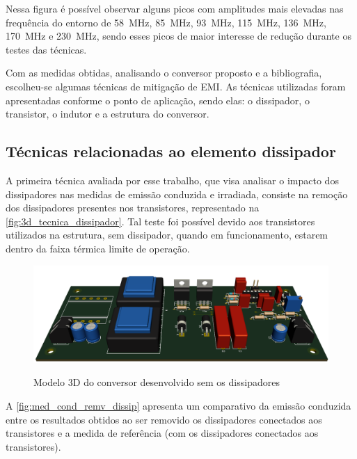     Nessa figura é possível observar alguns picos com amplitudes mais elevadas nas frequência do entorno de \SI{58}{\mega\hertz}, \SI{85}{\mega\hertz}, \SI{93}{\mega\hertz}, \SI{115}{\mega\hertz}, \SI{136}{\mega\hertz}, \SI{170}{\mega\hertz} e \SI{230}{\mega\hertz}, sendo esses picos de maior interesse de redução durante os testes das técnicas.
    
    Com as medidas obtidas, analisando o conversor proposto e a bibliografia, escolheu-se algumas técnicas de mitigação de EMI. As técnicas utilizadas foram apresentadas conforme o ponto de aplicação, sendo elas: o dissipador, o transistor, o indutor e a estrutura do conversor. 
    
    \subsection{Técnicas relacionadas ao elemento dissipador} \label{cap:result_tecnicas_dissip}
    
    A primeira técnica avaliada por esse trabalho, que visa analisar o impacto dos dissipadores nas medidas de emissão conduzida e irradiada, consiste na remoção dos dissipadores presentes nos transistores, representado na \autoref{fig:3d_tecnica_dissipador}. Tal teste foi possível devido aos transistores utilizados na estrutura, sem dissipador, quando em funcionamento, estarem dentro da faixa térmica limite de operação. 
    
    \begin{figure}[H]
    	\centering
    	\caption{Modelo 3D do conversor desenvolvido sem os dissipadores}
    	\includegraphics[scale=.35]{pdf/fotos/tecnica_dissipador.png}
        \label{fig:3d_tecnica_dissipador}
    \end{figure}
    
    A \autoref{fig:med_cond_remv_dissip} apresenta um comparativo da emissão conduzida entre os resultados obtidos ao ser removido os dissipadores conectados aos transistores e a medida de referência (com os dissipadores conectados aos transistores). 
    
